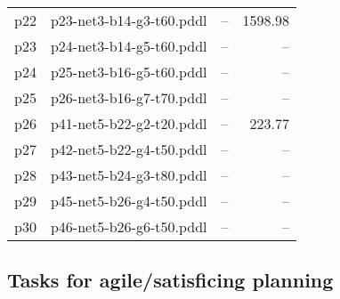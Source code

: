 \documentclass{article}
\begin{document}
\begin{center}
\begin{tabular}{@{}l|r|r|r@{}}
  p22& p23-net3-b14-g3-t60.pddl&--&1598.98\\
  p23& p24-net3-b14-g5-t60.pddl&--&--\\
  p24& p25-net3-b16-g5-t60.pddl&--&--\\
  p25& p26-net3-b16-g7-t70.pddl&--&--\\
  p26& p41-net5-b22-g2-t20.pddl&--&223.77\\
  p27& p42-net5-b22-g4-t50.pddl&--&--\\
  p28& p43-net5-b24-g3-t80.pddl&--&--\\
  p29& p45-net5-b26-g4-t50.pddl&--&--\\
  p30& p46-net5-b26-g6-t50.pddl&--&--
                            \end{tabular}
                            \end{center}
                    

                    \subsection*{Tasks for agile/satisficing planning}
                    
\end{document}
